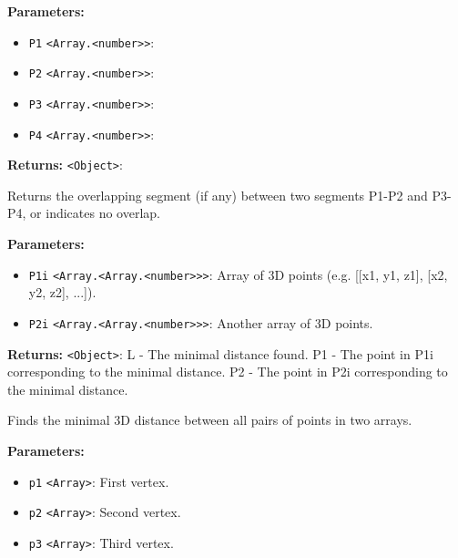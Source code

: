 \documentclass[12pt,a4paper]{article}
\begin{document}
\vspace{5mm}
\noindent {}


\noindent \textbf{Parameters:}
\begin{itemize}
  \item \texttt{P1} \texttt{<Array.<number>>}:
  \item \texttt{P2} \texttt{<Array.<number>>}:
  \item \texttt{P3} \texttt{<Array.<number>>}:
  \item \texttt{P4} \texttt{<Array.<number>>}:
\end{itemize}

\noindent \textbf{Returns:} \texttt{<Object>}:

\noindent Returns the overlapping segment (if any) between two segments P1-P2 and P3-P4,
or indicates no overlap.

\vspace{5mm}
\noindent {}


\noindent \textbf{Parameters:}
\begin{itemize}
  \item \texttt{P1i} \texttt{<Array.<Array.<number>>>}: Array of 3D points (e.g. [[x1, y1, z1], [x2, y2, z2], ...]).
  \item \texttt{P2i} \texttt{<Array.<Array.<number>>>}: Another array of 3D points.
\end{itemize}

\noindent \textbf{Returns:} \texttt{<Object>}: L  - The minimal distance found.
P1 - The point in P1i corresponding to the minimal distance.
P2 - The point in P2i corresponding to the minimal distance.

\noindent Finds the minimal 3D distance between all pairs of points in two arrays.

\vspace{5mm}
\noindent {}


\noindent \textbf{Parameters:}
\begin{itemize}
  \item \texttt{p1} \texttt{<Array>}: First vertex.
  \item \texttt{p2} \texttt{<Array>}: Second vertex.
  \item \texttt{p3} \texttt{<Array>}: Third vertex.
\end{itemize}
\end{document}

